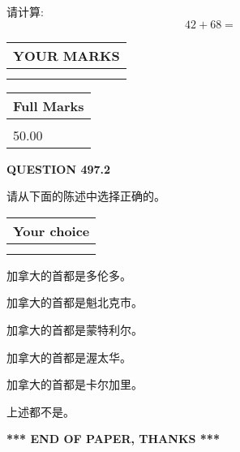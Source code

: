 \documentclass{ctexart}
\begin{document}
  
 
请计算:
\begin{equation}
42 +  %
68 = \nonumber
\end{equation}
 

 

 
  
\vspace{0.2in}
  
\noindent\begin{tabular}{|l|}
\hline
 YOUR MARKS  \\
\hline
 \\ 
 \\ 
\hline
\end{tabular}
\hspace{0.05in} \begin{tabular}{|l|}
\hline
 Full Marks  \\
\hline
 \\ 
50.00 \\
\hline
\end{tabular}
{\textbf{\Large{QUESTION
497.2 
}}}
  
  
请从下面的陈述中选择正确的。
  
  
\noindent\hspace{3.0in} \begin{tabular}{|l|}
\hline
Your choice \\
\hline
 \\ 
 \\ 
\hline
\end{tabular}
  
  
 
 
加拿大的首都是多伦多。
 
 
加拿大的首都是魁北克市。
 
 
加拿大的首都是蒙特利尔。
 
 
加拿大的首都是渥太华。
 
 
加拿大的首都是卡尔加里。
 
 
 上述都不是。
 
 
   
   
 \vspace{0.2in}
 
   
   
   
   
\vspace{1.0in} 
{\textbf{\large{ *** END OF PAPER, THANKS *** }}} 
   
\end{document}
